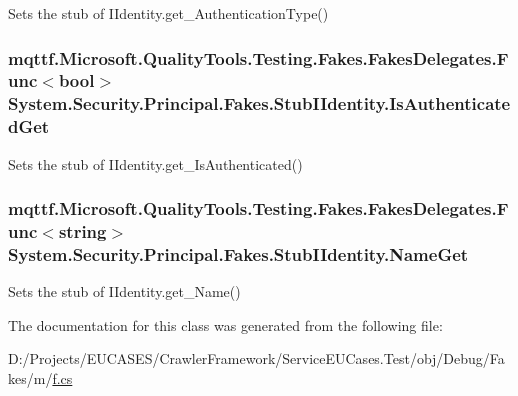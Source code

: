 Sets the stub of I\-Identity.\-get\-\_\-\-Authentication\-Type()

\hypertarget{class_system_1_1_security_1_1_principal_1_1_fakes_1_1_stub_i_identity_a0fde783af24ddc9d63b3806e6f348f82}{
\subsubsection[{Is\-Authenticated\-Get}]{\setlength{\rightskip}{0pt plus 5cm}mqttf.\-Microsoft.\-Quality\-Tools.\-Testing.\-Fakes.\-Fakes\-Delegates.\-Func$<$bool$>$ System.\-Security.\-Principal.\-Fakes.\-Stub\-I\-Identity.\-Is\-Authenticated\-Get}}\label{class_system_1_1_security_1_1_principal_1_1_fakes_1_1_stub_i_identity_a0fde783af24ddc9d63b3806e6f348f82}


Sets the stub of I\-Identity.\-get\-\_\-\-Is\-Authenticated()

\hypertarget{class_system_1_1_security_1_1_principal_1_1_fakes_1_1_stub_i_identity_aec36e15192ff1d8283441cdf5b2320b7}{
\subsubsection[{Name\-Get}]{\setlength{\rightskip}{0pt plus 5cm}mqttf.\-Microsoft.\-Quality\-Tools.\-Testing.\-Fakes.\-Fakes\-Delegates.\-Func$<$string$>$ System.\-Security.\-Principal.\-Fakes.\-Stub\-I\-Identity.\-Name\-Get}}\label{class_system_1_1_security_1_1_principal_1_1_fakes_1_1_stub_i_identity_aec36e15192ff1d8283441cdf5b2320b7}


Sets the stub of I\-Identity.\-get\-\_\-\-Name()



The documentation for this class was generated from the following file\-:\begin{DoxyCompactItemize}
\item 
D\-:/\-Projects/\-E\-U\-C\-A\-S\-E\-S/\-Crawler\-Framework/\-Service\-E\-U\-Cases.\-Test/obj/\-Debug/\-Fakes/m/\hyperlink{m_2f_8cs}{f.\-cs}\end{DoxyCompactItemize}
